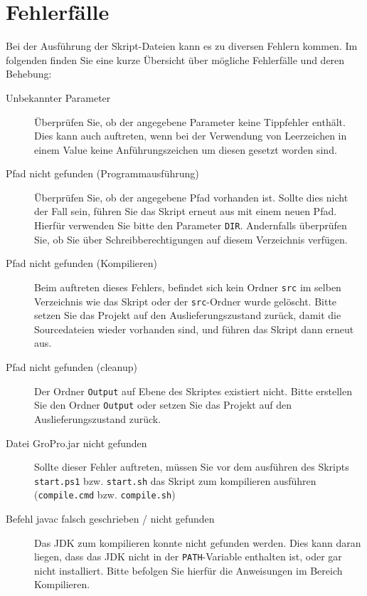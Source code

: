 \section{Fehlerfälle}
\label{sec:Fehlerfälle}
Bei der Ausführung der Skript-Dateien kann es zu diversen Fehlern kommen.
Im folgenden finden Sie eine kurze Übersicht über mögliche Fehlerfälle und deren Behebung:
\begin{description}
    \item [Unbekannter Parameter] Überprüfen Sie, ob der angegebene Parameter keine Tippfehler enthält. \\ Dies kann auch auftreten, wenn bei der Verwendung von Leerzeichen in einem Value keine Anführungszeichen um diesen gesetzt worden sind.
    \item [Pfad nicht gefunden (Programmausführung)] Überprüfen Sie, ob der angegebene Pfad vorhanden ist. Sollte dies nicht der Fall sein, führen Sie das Skript erneut aus mit einem neuen Pfad. Hierfür verwenden Sie bitte den Parameter \lstinline{DIR}. Andernfalls überprüfen Sie, ob Sie über Schreibberechtigungen auf diesem Verzeichnis verfügen.
    \item [Pfad nicht gefunden (Kompilieren)] Beim auftreten dieses Fehlers, befindet sich kein Ordner \lstinline{src} im selben Verzeichnis wie das Skript oder der \lstinline{src}-Ordner wurde gelöscht. Bitte setzen Sie das Projekt auf den Auslieferungszustand zurück, damit die Sourcedateien wieder vorhanden sind, und führen das Skript dann erneut aus.
    \item [Pfad nicht gefunden (cleanup)] Der Ordner \lstinline{Output} auf Ebene des Skriptes existiert nicht. Bitte erstellen Sie den Ordner \lstinline{Output} oder setzen Sie das Projekt auf den Auslieferungszustand zurück.
    \item [Datei GroPro.jar nicht gefunden] Sollte dieser Fehler auftreten, müssen Sie vor dem ausführen des Skripts \lstinline{start.ps1} bzw. \lstinline{start.sh} das Skript zum kompilieren ausführen (\lstinline{compile.cmd} bzw. \lstinline{compile.sh})
    \item [Befehl javac falsch geschrieben / nicht gefunden] Das JDK zum kompilieren konnte nicht gefunden werden. Dies kann daran liegen, dass das JDK nicht in der \lstinline{PATH}-Variable enthalten ist, oder gar nicht installiert. Bitte befolgen Sie hierfür die Anweisungen im Bereich Kompilieren.
\end{description}

\cleardoublepage